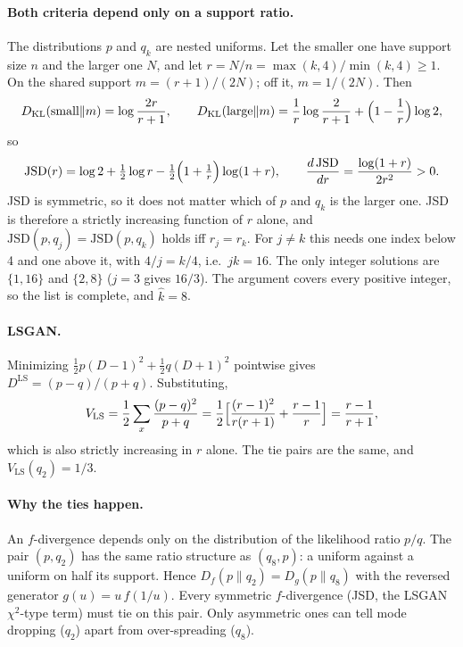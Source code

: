 \paragraph{Both criteria depend only on a support ratio.} The distributions
\(p\) and \(q_k\) are nested uniforms. Let the smaller one have support size
\(n\) and the larger one \(N\), and let \(r=N/n=\max(k,4)/\min(k,4)\ge1\). On
the shared support \(m=(r+1)/(2N)\); off it, \(m=1/(2N)\). Then
\[
  D_{\mathrm{KL}}(\text{small}\|m)=\log\frac{2r}{r+1},\qquad
  D_{\mathrm{KL}}(\text{large}\|m)=\frac1r\log\frac{2}{r+1}+\Bigl(1-\frac1r\Bigr)\log2,
\]
so
\[
  \mathrm{JSD}(r)=\log2+\tfrac12\log r-\tfrac12\Bigl(1+\tfrac1r\Bigr)\log(1+r),
  \qquad
  \frac{d\,\mathrm{JSD}}{dr}=\frac{\log(1+r)}{2r^2}>0 .
\]
JSD is symmetric, so it does not matter which of \(p\) and \(q_k\) is the
larger one. JSD is therefore a strictly increasing function of \(r\) alone,
and \(\mathrm{JSD}(p,q_j)=\mathrm{JSD}(p,q_k)\) holds iff \(r_j=r_k\). For
\(j\neq k\) this needs one index below 4 and one above it, with \(4/j=k/4\),
i.e.\ \(jk=16\). The only integer solutions are \(\{1,16\}\) and \(\{2,8\}\)
(\(j=3\) gives \(16/3\)). The argument covers every positive integer, so the
list is complete, and \(\hat k=8\).

\paragraph{LSGAN.} Minimizing \(\tfrac12p(D-1)^2+\tfrac12q(D+1)^2\) pointwise
gives \(D^{\mathrm{LS}}=(p-q)/(p+q)\). Substituting,
\[
  V_{\mathrm{LS}}=\frac12\sum_x\frac{(p-q)^2}{p+q}
  =\frac12\Bigl[\frac{(r-1)^2}{r(r+1)}+\frac{r-1}{r}\Bigr]
  =\frac{r-1}{r+1},
\]
which is also strictly increasing in \(r\) alone. The tie pairs are the same,
and \(V_{\mathrm{LS}}(q_2)=1/3\).

\paragraph{Why the ties happen.} An \(f\)-divergence depends only on the
distribution of the likelihood ratio \(p/q\). The pair \((p,q_2)\) has the
same ratio structure as \((q_8,p)\): a uniform against a uniform on half its
support. Hence \(D_f(p\|q_2)=D_g(p\|q_8)\) with the reversed generator
\(g(u)=u\,f(1/u)\). Every symmetric \(f\)-divergence (JSD, the LSGAN
\(\chi^2\)-type term) must tie on this pair. Only asymmetric ones can tell
mode dropping (\(q_2\)) apart from over-spreading (\(q_8\)).

